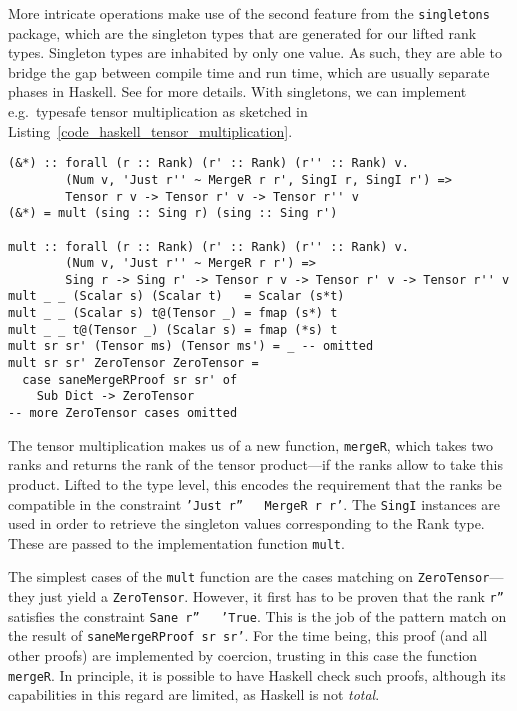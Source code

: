 More intricate operations make use of the second feature from the \texttt{singletons} package, which are the singleton types that are generated for our lifted rank types. Singleton types are inhabited by only one value. As such, they are able to bridge the gap between compile time and run time, which are usually separate phases in Haskell. See \cite{Eisenberg_2012} for more details. With singletons, we can implement e.g.\ typesafe tensor multiplication as sketched in Listing~\ref{code_haskell_tensor_multiplication}.
\begin{code}
  \begin{verbatim}
(&*) :: forall (r :: Rank) (r' :: Rank) (r'' :: Rank) v.
        (Num v, 'Just r'' ~ MergeR r r', SingI r, SingI r') =>
        Tensor r v -> Tensor r' v -> Tensor r'' v
(&*) = mult (sing :: Sing r) (sing :: Sing r')

mult :: forall (r :: Rank) (r' :: Rank) (r'' :: Rank) v.
        (Num v, 'Just r'' ~ MergeR r r') =>
        Sing r -> Sing r' -> Tensor r v -> Tensor r' v -> Tensor r'' v
mult _ _ (Scalar s) (Scalar t)   = Scalar (s*t)
mult _ _ (Scalar s) t@(Tensor _) = fmap (s*) t
mult _ _ t@(Tensor _) (Scalar s) = fmap (*s) t
mult sr sr' (Tensor ms) (Tensor ms') = _ -- omitted
mult sr sr' ZeroTensor ZeroTensor =
  case saneMergeRProof sr sr' of
    Sub Dict -> ZeroTensor
-- more ZeroTensor cases omitted
  \end{verbatim}
  \label{code_haskell_tensor_multiplication}
\end{code}
The tensor multiplication makes us of a new function, \texttt{mergeR}, which takes two ranks and returns the rank of the tensor product---if the ranks allow to take this product. Lifted to the type level, this encodes the requirement that the ranks be compatible in the constraint \texttt{'Just r'' ~ MergeR r r'}. The \texttt{SingI} instances are used in order to retrieve the singleton values corresponding to the Rank type. These are passed to the implementation function \texttt{mult}.

The simplest cases of the \texttt{mult} function are the cases matching on \texttt{ZeroTensor}---they just yield a \texttt{ZeroTensor}. However, it first has to be proven that the rank \texttt{r''} satisfies the constraint \texttt{Sane r'' ~ 'True}. This is the job of the pattern match on the result of \texttt{saneMergeRProof sr sr'}. For the time being, this proof (and all other proofs) are implemented by coercion, trusting in this case the function \texttt{mergeR}. In principle, it is possible to have Haskell check such proofs, although its capabilities in this regard are limited, as Haskell is not \emph{total}.

